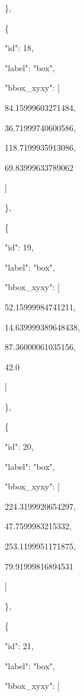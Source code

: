 \documentclass[10pt,a4paper]{article}
\begin{document}
    \},\allowbreak{}\par
    \{\par
      "id":\allowbreak{} 18,\allowbreak{}\par
      "label":\allowbreak{} "box",\allowbreak{}\par
      "bbox\_xyxy":\allowbreak{} [\par
        84.15999603271484,\allowbreak{}\par
        36.71999740600586,\allowbreak{}\par
        118.7199935913086,\allowbreak{}\par
        69.83999633789062\par
      ]\par
    \},\allowbreak{}\par
    \{\par
      "id":\allowbreak{} 19,\allowbreak{}\par
      "label":\allowbreak{} "box",\allowbreak{}\par
      "bbox\_xyxy":\allowbreak{} [\par
        52.15999984741211,\allowbreak{}\par
        14.639999389648438,\allowbreak{}\par
        87.36000061035156,\allowbreak{}\par
        42.0\par
      ]\par
    \},\allowbreak{}\par
    \{\par
      "id":\allowbreak{} 20,\allowbreak{}\par
      "label":\allowbreak{} "box",\allowbreak{}\par
      "bbox\_xyxy":\allowbreak{} [\par
        224.3199920654297,\allowbreak{}\par
        47.7599983215332,\allowbreak{}\par
        253.1199951171875,\allowbreak{}\par
        79.91999816894531\par
      ]\par
    \},\allowbreak{}\par
    \{\par
      "id":\allowbreak{} 21,\allowbreak{}\par
      "label":\allowbreak{} "box",\allowbreak{}\par
      "bbox\_xyxy":\allowbreak{} [\par
\end{document}
